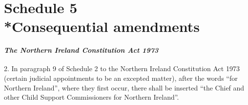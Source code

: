 \documentclass[12pt,a4paper]{article}
\begin{document}
\part[Schedule 5 --- Consequential amendments]{Schedule 5\\*Consequential amendments}

\renewcommand\parthead{--- Schedule 5}


%
%
%
%

\subsection*{\itshape The Northern Ireland Constitution Act 1973}

2. In paragraph 9 of Schedule 2 to the Northern Ireland Constitution Act 1973 (certain judicial appointments to be an excepted matter), after the words “for Northern Ireland”, where they first occur, there shall be inserted “the Chief and other Child Support Commissioners for Northern Ireland”.
\end{document}
